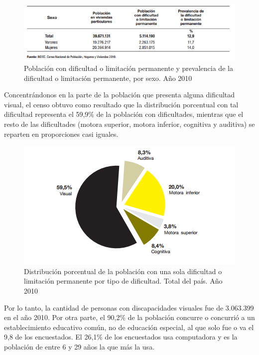 \begin{figure}[H]
\centering
\includegraphics{Figures/porcentaje_discapacitad_por_sexo}
\decoRule
\caption[]{Población con dificultad o limitación permanente y
prevalencia de la dificultad o limitación permanente, por sexo. Año 2010}
\label{fig:porcentaje_discapacitad_por_sexo}
\end{figure}

Concentrándonos en la parte de la población que presenta alguna dificultad visual, el censo obtuvo como resultado que la distribución porcentual
con tal dificultad representa el 59,9\% de la población con dificultades, mientras que el resto de las dificultades (motora superior, motora inferior, cognitiva y auditiva)
se reparten en proporciones casi iguales.

\begin{figure}[H]
\centering
\includegraphics{Figures/poblacion_discapacidad_porcentaje}
\decoRule
\caption[]{Distribución porcentual de la población con una sola dificultad o limitación permanente por tipo de dificultad. Total del país. Año 2010}
\label{fig:poblacion_discapacidad_porcentaje}
\end{figure}

Por lo tanto, la cantidad de personas con discapacidades visuales fue de 3.063.399 en el año 2010. Por otra parte, el 90,2\% de la población concurre
 o concurrió a un establecimiento educativo común, no de educación especial, al que solo fue o va el 9,8 de los encuestados.
 El 26,1\% de los encuestados usa computadora y es la población de entre 6 y 29 años la que más la usa.

